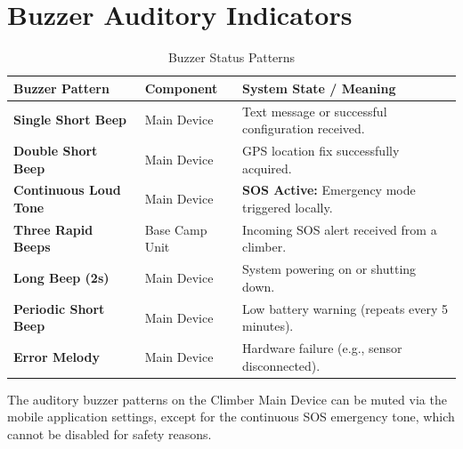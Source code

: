 \section{Buzzer Auditory Indicators}

\begin{table}[htbp]
\centering
\caption{Buzzer Status Patterns}
\label{tab:buzzer-indicators}
\begin{tabular}{@{}lll@{}}
\toprule
\textbf{Buzzer Pattern} & \textbf{Component} & \textbf{System State / Meaning} \\ \midrule
\textbf{Single Short Beep} & Main Device & Text message or successful configuration received. \\
\textbf{Double Short Beep} & Main Device & GPS location fix successfully acquired. \\
\textbf{Continuous Loud Tone} & Main Device & \textbf{SOS Active:} Emergency mode triggered locally. \\
\textbf{Three Rapid Beeps} & Base Camp Unit & Incoming SOS alert received from a climber. \\
\textbf{Long Beep (2s)} & Main Device & System powering on or shutting down. \\
\textbf{Periodic Short Beep} & Main Device & Low battery warning (repeats every 5 minutes). \\
\textbf{Error Melody} & Main Device & Hardware failure (e.g., sensor disconnected). \\
\bottomrule
\end{tabular}
\end{table}

\begin{infobox}
The auditory buzzer patterns on the Climber Main Device can be muted via the mobile application settings, except for the continuous SOS emergency tone, which cannot be disabled for safety reasons.
\end{infobox}
